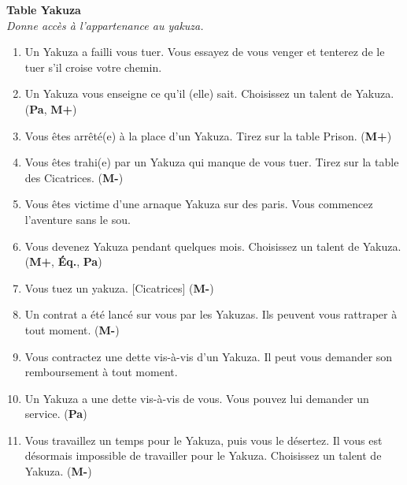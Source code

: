 \documentclass[11pt,twoside,a4paper]{article}
\begin{document}
\begin{multicols*}{2}
\textbf{Table Yakuza  } ~\\
	\emph{\footnotesize Donne acc{\`e}s {\`a} l'appartenance au yakuza. } %
\begin{enumerate}
	\footnotesize
	\item[2] Un Yakuza a failli vous tuer. Vous essayez de vous venger et tenterez de le tuer s'il croise votre chemin. 
	\item[3] Un Yakuza vous enseigne ce qu'il (elle) sait. Choisissez un talent de Yakuza. (\textbf{Pa}, \textbf{M+})
	\item[4] Vous {\^e}tes arr{\^e}t{\'e}(e) {\`a} la place d'un Yakuza. Tirez sur la table Prison. (\textbf{M+})
	\item[5] Vous {\^e}tes trahi(e) par un Yakuza qui manque de vous tuer. Tirez sur la table des Cicatrices. 	(\textbf{M-})
	\item[6] Vous {\^e}tes victime d'une arnaque Yakuza sur des paris. Vous commencez l'aventure sans le sou. 
	\item[7] Vous devenez Yakuza pendant quelques mois. Choisissez un talent de Yakuza. (\textbf{M+}, \textbf{{\'E}q.}, \textbf{Pa})
	\item[8] Vous tuez un yakuza. 	[Cicatrices] (\textbf{M-})
	\item[9] Un contrat a {\'e}t{\'e} lanc{\'e} sur vous par les Yakuzas. Ils peuvent vous rattraper {\`a} tout moment. (\textbf{M-})
	\item[10] Vous contractez une dette vis-{\`a}-vis d'un Yakuza. Il peut vous demander son remboursement {\`a} tout moment. 
	\item[11] Un Yakuza a une dette vis-{\`a}-vis de vous. Vous pouvez lui demander un service. (\textbf{Pa})
	\item[12] Vous travaillez un temps pour le Yakuza, puis vous le d{\'e}sertez. Il vous est d{\'e}sormais impossible de travailler pour le Yakuza. Choisissez un talent de Yakuza. (\textbf{M-})
\end{enumerate}


\end{multicols*}
\end{document}
